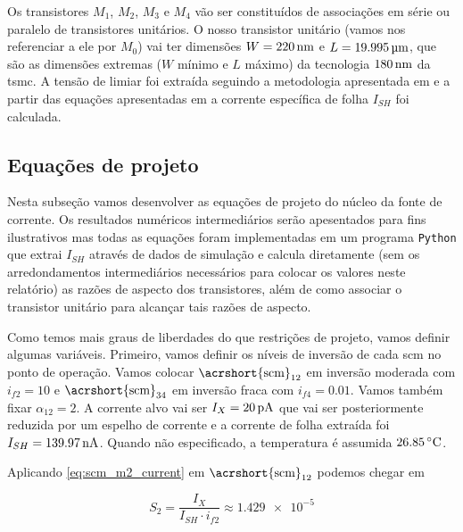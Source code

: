 \documentclass[10pt,a4paper]{extreport}
\newcommand{\?}{\stackrel{?}{=}}
\newcommand{\sis}[2]{\complexnum{#1}\,\si[per-mode=symbol]{#2}}
\begin{document}
Os transistores $M_1$, $M_2$, $M_3$ e $M_4$ vão ser constituídos de associações em série ou paralelo de transistores unitários. O nosso transistor unitário (vamos nos referenciar a ele por $M_0$) vai ter dimensões $W=\sis{220}{\nano\meter}$ e $L=\sis{19.995}{\micro\meter}$, que são as dimensões extremas ($W$ mínimo e $L$ máximo) da tecnologia $\sis{180}{\nano\meter}$ da \acrshort{tsmc}. A tensão de limiar foi extraída seguindo a metodologia apresentada em \cite{vt:extract} e a partir das equações apresentadas em \cite{acm:book} a corrente específica de folha $I_{SH}$ foi calculada.

\subsection{Equações de projeto}

Nesta subseção vamos desenvolver as equações de projeto do núcleo da fonte de corrente. Os resultados numéricos intermediários serão apesentados para fins ilustrativos mas todas as equações foram implementadas em um programa \texttt{Python} que extrai $I_{SH}$ através de dados de simulação e calcula diretamente (sem os arredondamentos intermediários necessários para colocar os valores neste relatório) as razões de aspecto dos transistores, além de como associar o transistor unitário para alcançar tais razões de aspecto.

Como temos mais graus de liberdades do que restrições de projeto, vamos definir algumas variáveis. Primeiro, vamos definir os níveis de inversão de cada \acrshort{scm} no ponto de operação. Vamos colocar $\text{\acrshort{scm}}_{12}$ em inversão moderada com $i_{f2}=10$ e $\text{\acrshort{scm}}_{34}$ em inversão fraca com $i_{f4}=\num{0.01}$. Vamos também fixar $\alpha_{12}=2$. A corrente alvo vai ser $I_X=\sis{20}{\pico\ampere}$ que vai ser posteriormente reduzida por um espelho de corrente e a corrente de folha extraída foi $I_{SH}=\sis{139.97}{\nano\ampere}$. Quando não especificado, a temperatura é assumida $\sis{26.85}{\celsius}$.

Aplicando \eqref{eq:scm_m2_current} em $\text{\acrshort{scm}}_{12}$ podemos chegar em

\begin{equation}
    \label{eq:sbcs_s2}
    S_2=\frac{I_X}{I_{SH}\cdot i_{f2}}\approx\num{1.429e-5}
\end{equation}
\end{document}
